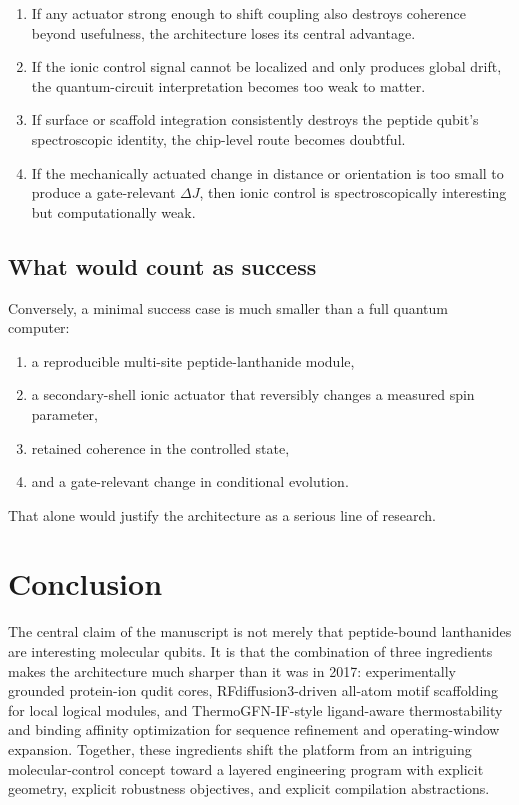 \documentclass[11pt]{report}
\theoremstyle{definition}
\begin{document}
\begin{enumerate}[leftmargin=2em]
\item If any actuator strong enough to shift coupling also destroys coherence beyond usefulness, the architecture loses its central advantage.
\item If the ionic control signal cannot be localized and only produces global drift, the quantum-circuit interpretation becomes too weak to matter.
\item If surface or scaffold integration consistently destroys the peptide qubit's spectroscopic identity, the chip-level route becomes doubtful.
\item If the mechanically actuated change in distance or orientation is too small to produce a gate-relevant $\Delta J$, then ionic control is spectroscopically interesting but computationally weak.
\end{enumerate}

\section{What would count as success}
Conversely, a minimal success case is much smaller than a full quantum computer:

\begin{enumerate}[leftmargin=2em]
\item a reproducible multi-site peptide-lanthanide module,
\item a secondary-shell ionic actuator that reversibly changes a measured spin parameter,
\item retained coherence in the controlled state,
\item and a gate-relevant change in conditional evolution.
\end{enumerate}

That alone would justify the architecture as a serious line of research.

\chapter{Conclusion}
The central claim of the manuscript is not merely that peptide-bound lanthanides are interesting molecular qubits. It is that the combination of three ingredients makes the architecture much sharper than it was in 2017: experimentally grounded protein-ion qudit cores, RFdiffusion3-driven all-atom motif scaffolding for local logical modules, and ThermoGFN-IF-style ligand-aware thermostability and binding affinity optimization for sequence refinement and operating-window expansion. Together, these ingredients shift the platform from an intriguing molecular-control concept toward a layered engineering program with explicit geometry, explicit robustness objectives, and explicit compilation abstractions.
\end{document}
